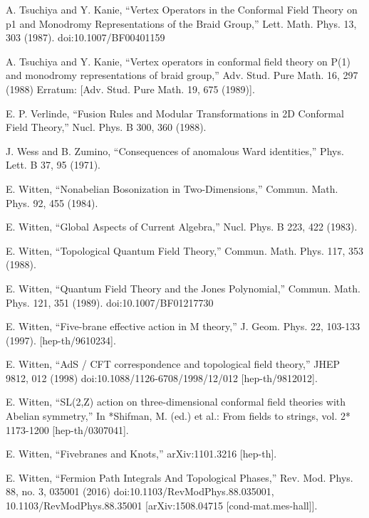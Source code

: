 \begin{enumerate}[label={[\arabic*]},leftmargin=3.2em,itemsep=2pt,topsep=4pt]
\item A. Tsuchiya and Y. Kanie, “Vertex Operators in the Conformal Field Theory on p1 and Monodromy Representations of the Braid Group,” Lett. Math. Phys. 13, 303 (1987). doi:10.1007/BF00401159

\item A. Tsuchiya and Y. Kanie, “Vertex operators in conformal field theory on P(1) and monodromy representations of braid group,” Adv. Stud. Pure Math. 16, 297 (1988) Erratum: [Adv. Stud. Pure Math. 19, 675 (1989)].

\item E. P. Verlinde, “Fusion Rules and Modular Transformations in 2D Conformal Field Theory,” Nucl. Phys. B 300, 360 (1988).

\item J. Wess and B. Zumino, “Consequences of anomalous Ward identities,” Phys. Lett. B 37, 95 (1971).

\item E. Witten, “Nonabelian Bosonization in Two-Dimensions,” Commun. Math. Phys. 92, 455 (1984).

\item E. Witten, “Global Aspects of Current Algebra,” Nucl. Phys. B 223, 422 (1983).

\item E. Witten, “Topological Quantum Field Theory,” Commun. Math. Phys. 117, 353 (1988).

\item E. Witten, “Quantum Field Theory and the Jones Polynomial,” Commun. Math. Phys. 121, 351 (1989). doi:10.1007/BF01217730

\item E. Witten, “Five-brane effective action in M theory,” J. Geom. Phys. 22, 103-133 (1997). [hep-th/9610234].

\item E. Witten, “AdS / CFT correspondence and topological field theory,” JHEP 9812, 012 (1998) doi:10.1088/1126-6708/1998/12/012 [hep-th/9812012].

\item E. Witten, “SL(2,Z) action on three-dimensional conformal field theories with Abelian symmetry,” In *Shifman, M. (ed.) et al.: From fields to strings, vol. 2* 1173-1200 [hep-th/0307041].

\item E. Witten, “Fivebranes and Knots,” arXiv:1101.3216 [hep-th].

\item E. Witten, “Fermion Path Integrals And Topological Phases,” Rev. Mod. Phys. 88, no. 3, 035001 (2016) doi:10.1103/RevModPhys.88.035001, 10.1103/RevModPhys.88.35001 [arXiv:1508.04715 [cond-mat.mes-hall]].

\end{enumerate}